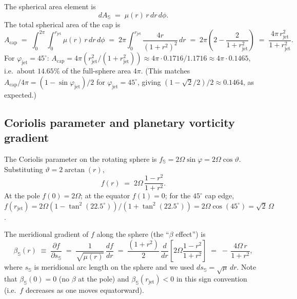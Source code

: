 \documentclass[11pt]{article}
\newcommand{\rjet}{r_{\mathrm{jet}}}
\newcommand{\phijet}{\varphi_{\mathrm{jet}}}
\begin{document}
The spherical area element is
\begin{equation}
  dA_{\mathbb{S}} \;=\; \mu(r)\,r\,dr\,d\phi.
  \label{eq:area}
\end{equation}
The total spherical area of the cap is
\begin{equation}
  A_{\mathrm{cap}}
  \;=\; \int_{0}^{2\pi}\!\!\int_{0}^{\rjet} \mu(r)\,r\,dr\,d\phi
  \;=\; 2\pi \int_{0}^{\rjet} \frac{4 r}{(1+r^{2})^{2}}\,dr
  \;=\; 2\pi\!\left(2 - \frac{2}{1+\rjet^{2}}\right)
  \;=\; \frac{4\pi\,\rjet^{2}}{1+\rjet^{2}}.
  \label{eq:Acap}
\end{equation}
For $\phijet = 45^\circ$: $A_{\mathrm{cap}} = 4\pi(\rjet^{2}/(1+\rjet^{2}))
\approx 4\pi \cdot 0.1716/1.1716 \approx 4\pi \cdot 0.1465$, i.e.\ about
$14.65\%$ of the full-sphere area $4\pi$. (This matches
$A_{\mathrm{cap}}/4\pi = (1 - \sin\phijet)/2$ for $\phijet = 45^\circ$,
giving $(1 - \sqrt{2}/2)/2 \approx 0.1464$, as expected.)

\subsection{Coriolis parameter and planetary vorticity gradient}

The Coriolis parameter on the rotating sphere is $f_{\mathbb{S}} =
2\Omega\sin\varphi = 2\Omega\cos\vartheta$.  Substituting
$\vartheta = 2\arctan(r)$,
\begin{equation}
  f(r) \;=\; 2\Omega\,\frac{1 - r^{2}}{1 + r^{2}}.
  \label{eq:fr}
\end{equation}
At the pole $f(0) = 2\Omega$; at the equator $f(1) = 0$; for the
$45^\circ$ cap edge, $f(\rjet) = 2\Omega(1-\tan^{2}(22.5^\circ))/
(1+\tan^{2}(22.5^\circ)) = 2\Omega \cos(45^\circ) = \sqrt{2}\,\Omega$.

The meridional gradient of $f$ along the sphere (the ``$\beta$ effect'')
is
\begin{equation}
  \beta_{\mathbb{S}}(r) \;\equiv\; \frac{\partial f}{\partial s_{\mathbb{S}}}
  \;=\; \frac{1}{\sqrt{\mu(r)}}\,\frac{df}{dr}
  \;=\; \frac{(1+r^{2})}{2}\,\frac{d}{dr}\!\!\left[2\Omega
  \frac{1-r^{2}}{1+r^{2}}\right]
  \;=\; -\,\frac{4\Omega\,r}{1+r^{2}},
  \label{eq:beta}
\end{equation}
where $s_{\mathbb{S}}$ is meridional arc length on the sphere and we used
$ds_{\mathbb{S}} = \sqrt{\mu}\,dr$.  Note that $\beta_{\mathbb{S}}(0) = 0$
(no $\beta$ at the pole) and $\beta_{\mathbb{S}}(\rjet) < 0$ in this
sign convention (i.e.\ $f$ decreases as one moves equatorward).
\end{document}

